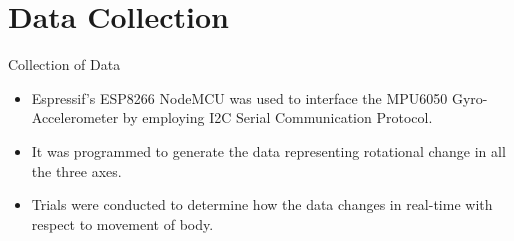 \documentclass[aspectratio=169,xcolor=dvipsnames]{beamer}
\begin{document}
\section{Data Collection}





        


\begin{frame}{Collection of Data}
    \begin{itemize}
        \item Espressif's ESP8266 NodeMCU was used to interface the MPU6050 Gyro-Accelerometer by employing I2C Serial Communication Protocol.
        \item It was programmed to generate the data representing rotational change in all the three axes. 
        \item Trials were conducted to determine how the data changes in real-time with respect to movement of body.
    \end{itemize}
    
\end{frame}



  
\end{document}
